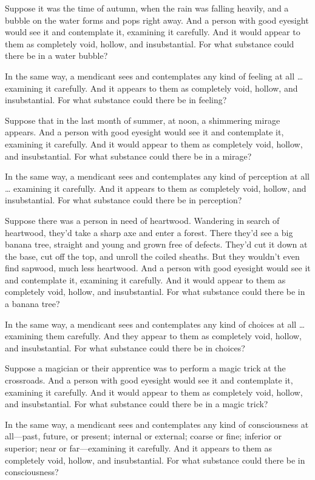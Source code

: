 \documentclass[12pt,openany]{book}%
\begin{document}
Suppose it was the time of autumn, when the rain was falling heavily, and a bubble on the water forms and pops right away. And a person with good eyesight would see it and contemplate it, examining it carefully. And it would appear to them as completely void, hollow, and insubstantial. For what substance could there be in a water bubble? 

In the same way, a mendicant sees and contemplates any kind of feeling at all … examining it carefully. And it appears to them as completely void, hollow, and insubstantial. For what substance could there be in feeling? 

Suppose that in the last month of summer, at noon, a shimmering mirage appears. And a person with good eyesight would see it and contemplate it, examining it carefully. And it would appear to them as completely void, hollow, and insubstantial. For what substance could there be in a mirage? 

In the same way, a mendicant sees and contemplates any kind of perception at all … examining it carefully. And it appears to them as completely void, hollow, and insubstantial. For what substance could there be in perception? 

Suppose there was a person in need of heartwood. Wandering in search of heartwood, they’d take a sharp axe and enter a forest. There they’d see a big banana tree, straight and young and grown free of defects. They’d cut it down at the base, cut off the top, and unroll the coiled sheaths. But they wouldn’t even find sapwood, much less heartwood. And a person with good eyesight would see it and contemplate it, examining it carefully. And it would appear to them as completely void, hollow, and insubstantial. For what substance could there be in a banana tree? 

In the same way, a mendicant sees and contemplates any kind of choices at all … examining them carefully. And they appear to them as completely void, hollow, and insubstantial. For what substance could there be in choices? 

Suppose a magician or their apprentice was to perform a magic trick at the crossroads. And a person with good eyesight would see it and contemplate it, examining it carefully. And it would appear to them as completely void, hollow, and insubstantial. For what substance could there be in a magic trick? 

In the same way, a mendicant sees and contemplates any kind of consciousness at all—past, future, or present; internal or external; coarse or fine; inferior or superior; near or far—examining it carefully. And it appears to them as completely void, hollow, and insubstantial. For what substance could there be in consciousness? 
\end{document}
